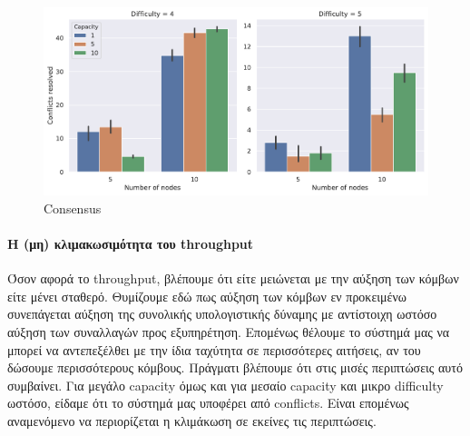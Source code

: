 \documentclass[titlepage]{article}
\begin{document}
\begin{figure}[!ht]
    \includegraphics[width=\textwidth]{scalability_conflicts_resolved.pdf}
    \caption{Consensus}
\end{figure}

\paragraph{Η (μη) κλιμακωσιμότητα του throughput} Όσον αφορά το throughput, βλέπουμε ότι είτε μειώνεται με την αύξηση των κόμβων είτε μένει σταθερό. Θυμίζουμε εδώ πως αύξηση των κόμβων εν προκειμένω συνεπάγεται αύξηση της συνολικής υπολογιστικής δύναμης με αντίστοιχη ωστόσο αύξηση των συναλλαγών προς εξυπηρέτηση. Επομένως θέλουμε το σύστημά μας να μπορεί να αντεπεξέλθει με την ίδια ταχύτητα σε περισσότερες αιτήσεις, αν του δώσουμε περισσότερους κόμβους. Πράγματι βλέπουμε ότι στις μισές περιπτώσεις αυτό συμβαίνει. Για μεγάλο capacity όμως και για μεσαίο capacity και μικρο difficulty ωστόσο, είδαμε ότι το σύστημά μας υποφέρει από conflicts. Είναι επομένως αναμενόμενο να περιορίζεται η κλιμάκωση σε εκείνες τις περιπτώσεις.
\end{document}
